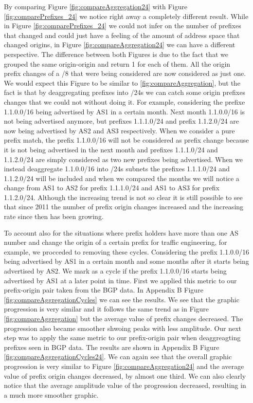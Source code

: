 \documentclass[11pt,a4paper]{scrreprt}
\begin{document}
By comparing Figure \ref{fig:compareAggregation24} with Figure \ref{fig:comparePrefixes_24} we notice right away a completely different result. While in Figure \ref{fig:comparePrefixes_24} we could not infer on the number of prefixes that changed and could just have a feeling of the amount of address space that changed origins, in Figure \ref{fig:compareAggregation24} we can have a different perspective. 
The difference between both Figures is due to the fact that we grouped the same origin-origin and return 1 for each of them. All the origin prefix changes of a /8 that were being considered are now considered as just one. 
We would expect this Figure to be similar to \ref{fig:compareAggregation}, but the fact is that by deaggregating prefixes into /24s we can catch some origin prefixes changes that we could not without doing it. 
For example, considering the prefixe 1.1.0.0/16 being advertised by AS1 in a certain month. Next month 1.1.0.0/16 is not being advertised anymore, but prefixes 1.1.1.0/24 and prefix 1.1.2.0/24 are now being advertised by AS2 and AS3 respectively. When we consider a pure prefix match, the prefix 1.1.0.0/16 will not be considered as prefix change because it is not being advertised in the next month and prefixes 1.1.1.0/24 and 1.1.2.0/24 are simply considered as two new prefixes being advertised. When we instead deaggregate 1.1.0.0/16 into /24s subnets the prefixes 1.1.1.0/24 and 1.1.2.0/24 will be included and when we compared the months we will notice a change from AS1 to AS2 for prefix 1.1.1.0/24 and AS1 to AS3 for prefix 1.1.2.0/24. 
Although the increasing trend is not so clear it is still possible to see that since 2011 the number of prefix origin changes increased and the increasing rate since then has been growing.

To account also for the situations where prefix holders have more than one AS number and change the origin of a certain prefix for traffic engineering, for example, we procceded to removing these cycles. Considering the prefix 1.1.0.0/16 being advertised by AS1 in a certain month and some months after it starts being advertised by AS2. We mark as a cycle if the prefix 1.1.0.0/16 starts being advertised by AS1 at a later point in time.  
First we applied this metric to our prefix-origin pair taken from the BGP data. In Appendix B Figure \ref{fig:compareAggregationCycles} we can see the results.
We see that the graphic progression is very similar and it follows the same trend as in Figure \ref{fig:compareAggregation} but the average value of prefix changes decreased. The progression also became smoother shwoing peaks with less amplitude. 
Our next step was to apply the same metric to our prefix-origin pair when deaggreagting prefixes seen in BGP data. The results are shown in Appendix B Figure \ref{fig:compareAggregationCycles24}. We can again see that the overall graphic progression is very similar to Figure \ref{fig:compareAggregation24} and the average value of prefix origin changes decreased, by almost one third. We can also clearly notice that the average amplitude value of the progression decreased, resulting in a much more smoother graphic.
\end{document}
